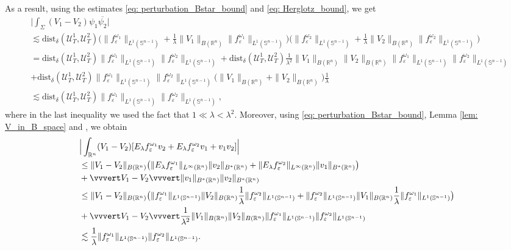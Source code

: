 \documentclass[10pt,a4paper]{amsart}
\theoremstyle{remark}
\theoremstyle{definition}
\newcommand{\R}{\mathbb{R}}
\newcommand{\Sph}{\mathbb{S}}
\newcommand{\dist}{\mathrm{dist}}
\newcommand{\om}{\omega}
\def\ve{\varepsilon}
\def\lec{\lesssim}
\def\cal{\mathcal}
\def\ovl{\overline}
\begin{document}
As a result, using the estimates \eqref{eq: perturbation_Bstar_bound} and \eqref{eq: Herglotz_bound}, we get
% 
\begin{align*}
&\Big| \int_\Sigma (V_1- V_2)\psi_1 \ovl{\psi_2} \Big|  \\
%
&\lec \dist_\delta(\cal{U}^1_T, \cal{U}^2_T) \Big( \|f^{\om_1}_\ve\|_{L^1(\Sph^{n-1})} + \frac{1}{\lambda} \|V_1\|_{B(\R^n)} \|f^{\om_1}_\ve\|_{L^1(\Sph^{n-1})} \Big)  
\Big( \|f^{\om_2}_\ve\|_{L^1(\Sph^{n-1})} + \frac{1}{\lambda} \|V_2\|_{B(\R^n)}\|f^{\om_2}_\ve\|_{L^1(\Sph^{n-1})} \Big) \\
%
&= \dist_\delta(\cal{U}^1_T, \cal{U}^2_T) \|f^{\om_1}_\ve\|_{L^1(\Sph^{n-1})} \|f^{\om_2}_\ve\|_{L^1(\Sph^{n-1})}
+ \dist_\delta(\cal{U}^1_T, \cal{U}^2_T) \frac{1}{\lambda^2}\|V_1\|_{B(\R^n)}\|V_2\|_{B(\R^n)} \|f^{\om_1}_\ve\|_{L^1(\Sph^{n-1})} \|f^{\om_2}_\ve\|_{L^1(\Sph^{n-1})}\\
%
&+ \dist_\delta(\cal{U}^1_T, \cal{U}^2_T)  \|f^{\om_1}_\ve\|_{L^1(\Sph^{n-1})}\|f^{\om_2}_\ve\|_{L^1(\Sph^{n-1})} \big(\|V_1\|_{B(\R^n)}+\|V_2\|_{B(\R^n)}\big) \frac{1}{\lambda} \\
%
&\lec  \dist_\delta(\cal{U}^1_T, \cal{U}^2_T) \|f^{\om_1}_\ve\|_{L^1(\Sph^{n-1})} \|f^{\om_2}_\ve\|_{L^1(\Sph^{n-1})},
\end{align*}
where in the last inequality we used the fact that $1\ll \lambda < \lambda^2$. 
%
%
Moreover, using \eqref{eq: perturbation_Bstar_bound}, Lemma \ref{lem: V_in_B_space} and \cite[Lemma 2.3]{zbMATH08122191}, we obtain
%
\begin{align*}
&\Big| \int_{\R^n}(V_1-V_2)[E_\lambda f^{\om_1}_\ve v_2 + E_\lambda f^{\om_2}_\ve v_1 + v_1 v_2] \Big| \\
%
&\leq \|V_1-V_2\|_{B(\R^n)}\big( \|E_\lambda f^{\om_1}_\ve\|_{L^\infty(\R^n)} \|v_2\|_{B^*(\R^n)} 
+ \|E_\lambda f^{\om_2}_\ve\|_{L^\infty(\R^n)} \|v_1\|_{B^*(\R^n)}\big) \\
%
&+ \vvvert V_1-V_2\vvvert \|v_1\|_{B^*(\R^n)} \|v_2\|_{B^*(\R^n)} \\
%
&\leq \|V_1-V_2\|_{B(\R^n)} \big( \|f^{\om_1}_\ve\|_{L^1(\Sph^{n-1})} \|V_2\|_{B(\R^n)} \frac{1}{\lambda} \|f^{\om_2}_\ve\|_{L^1(\Sph^{n-1})} +  \|f^{\om_2}_\ve\|_{L^1(\Sph^{n-1})} \|V_1\|_{B(\R^n)} \frac{1}{\lambda} \|f^{\om_1}_\ve\|_{L^1(\Sph^{n-1})} \big) \\
%
&+\vvvert V_1-V_2\vvvert \frac{1}{\lambda^2} \|V_1\|_{B(\R^n)}\|V_2\|_{B(\R^n)} \|f^{\om_1}_\ve\|_{L^1(\Sph^{n-1})} \|f^{\om_2}_\ve\|_{L^1(\Sph^{n-1})} \\
&\lec \frac{1}{\lambda}  \|f^{\om_1}_\ve\|_{L^1(\Sph^{n-1})} \|f^{\om_2}_\ve\|_{L^1(\Sph^{n-1})}.
\end{align*}
\end{document}
